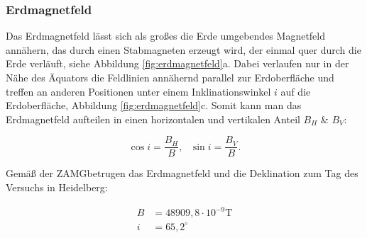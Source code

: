 \documentclass{article}
\begin{document}

\newpage
\subsubsection{Erdmagnetfeld}

Das Erdmagnetfeld lässt sich als großes die Erde umgebendes Magnetfeld annähern, das durch einen Stabmagneten erzeugt wird, der einmal quer durch die Erde verläuft, siehe Abbildung \ref{fig:erdmagnetfeld}a. Dabei verlaufen nur in der Nähe des Äquators die Feldlinien annähernd parallel zur Erdoberfläche und treffen an anderen Positionen unter einem Inklinationswinkel $i$ auf die Erdoberfläche, Abbildung \ref{fig:erdmagnetfeld}c. Somit kann man das Erdmagnetfeld aufteilen in einen horizontalen und vertikalen Anteil $B_H$ \& $B_V$:

\begin{equation}
        \cos{i} = \frac{B_H}{B}, \ \ \  \sin{i} = \frac{B_V}{B}.
        \label{eq:Inklination}
\end{equation}

Gemäß der ZAMG\footnotemark betrugen das Erdmagnetfeld und die Deklination zum Tag des Versuchs in Heidelberg:


\begin{equation}
    \begin{split}
        B &= 48909,8 \cdot 10^{-9} \text{T} \\
        i &= 65,2^\circ
    \end{split}
    \label{eq:Erdmagnetfeld-Theo}
\end{equation}
\end{document}
